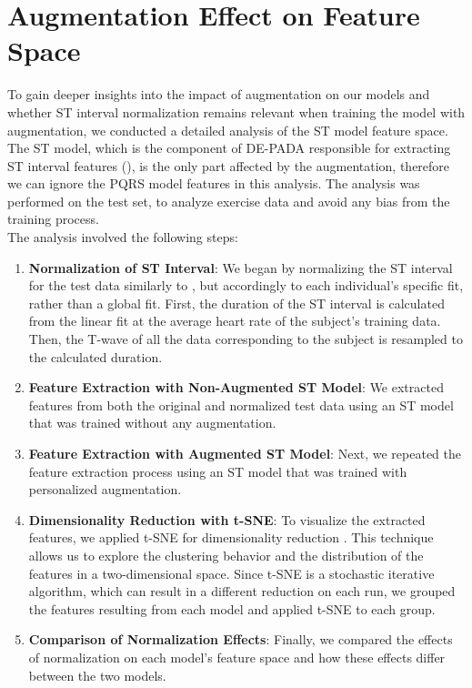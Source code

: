 \section{Augmentation Effect on Feature Space}
To gain deeper insights into the impact of augmentation on our models and whether ST interval normalization remains relevant when training the model with augmentation, we conducted a detailed analysis of the ST model feature space. The ST model, which is the component of DE-PADA responsible for extracting ST interval features (), is the only part affected by the augmentation, therefore we can ignore the PQRS model features in this analysis.
The analysis was performed on the test set, to analyze exercise data and avoid any bias from the training process.\\
The analysis involved the following steps:

\begin{enumerate}
    \item \textbf{Normalization of ST Interval}: We began by normalizing the ST interval for the test data similarly to \cite{Hwang2021}, but accordingly to each individual’s specific fit, rather than a global fit. First, the duration of the ST interval is calculated from the linear fit at the average heart rate of the subject's training data. Then, the T-wave of all the data corresponding to the subject is resampled to the calculated duration.

    \item \textbf{Feature Extraction with Non-Augmented ST Model}: We extracted features from both the original and normalized test data using an ST model that was trained without any augmentation.

    \item \textbf{Feature Extraction with Augmented ST Model}: Next, we repeated the feature extraction process using an ST model that was trained with personalized augmentation.

    \item \textbf{Dimensionality Reduction with t-SNE}: To visualize the extracted features, we applied t-SNE for dimensionality reduction \cite{vandermaaten08a}. This technique allows us to explore the clustering behavior and the distribution of the features in a two-dimensional space.
    Since t-SNE is a stochastic iterative algorithm, which can result in a different reduction on each run, we grouped the features resulting from each model and applied t-SNE to each group.

    \item \textbf{Comparison of Normalization Effects}: Finally, we compared the effects of normalization on each model's feature space and how these effects differ between the two models.
\end{enumerate}

